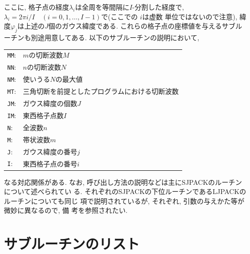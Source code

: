 \documentclass[a4j]{jarticle}
\begin{document}
ここに, 格子点の経度$\lambda_i$は全周を等間隔に$I$-分割した経度で,
$\lambda_i=2\pi i/I\quad (i=0,1,\ldots,I-1)$で(ここでの $i$は虚数
単位ではないので注意),
緯度$\varphi_j$は上述の$J$個のガウス緯度である.
これらの格子点の座標値を与えるサブルーチンも別途用意してある.
以下のサブルーチンの説明において,
\begin{center}
\begin{tabular}{ll}
{\tt MM}:& $m$の切断波数$M$\\
{\tt NN}:& $n$の切断波数$N$\\
{\tt NM}:& 使いうる$N$の最大値\\
{\tt MT}:& 三角切断を前提としたプログラムにおける切断波数\\
{\tt JM}:& ガウス緯度の個数$J$\\
{\tt IM}:& 東西格子点数$I$\\
{\tt N}:& 全波数$n$\\
{\tt M}:& 帯状波数$m$\\
{\tt J}:& ガウス緯度の番号$j$\\
{\tt I}:& 東西格子点の番号$i$
\end{tabular}
\end{center}
なる対応関係がある.
なお, 呼び出し方法の説明などは主にSJPACKのルーチンについて述べられてい
る. それぞれのSJPACKの下位ルーチンであるLJPACKのルーチンについても同じ
項で説明されているが, それぞれ, 引数の与えかた等が微妙に異なるので, 備
考を参照されたい.


\section{サブルーチンのリスト}
\end{document}
